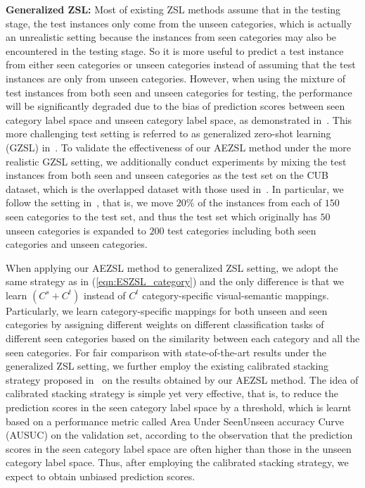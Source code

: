 \documentclass[journal]{IEEEtran}
\begin{document}
\noindent\textbf{Generalized ZSL:} 
Most of existing ZSL methods assume that in the testing stage, the test instances only come from the unseen categories, which is actually an unrealistic setting because the instances from seen categories may also be encountered in the testing stage. So it is more useful to predict a test instance from either seen categories or unseen categories instead of assuming that the test instances are only from unseen categories. However, when using the mixture of test instances from both seen and unseen categories for testing, the performance will be significantly degraded due to the bias of prediction scores between seen category label space and unseen category label space, as demonstrated in~\cite{socher2013zero,chao2016empirical}. This more challenging test setting is referred to as generalized zero-shot learning (GZSL) in~\cite{chao2016empirical}. To validate the effectiveness of our AEZSL method under the more realistic GZSL setting, we additionally conduct experiments by mixing the test instances from both seen and unseen categories as the test set on the CUB dataset, which is the overlapped dataset with those used in~\cite{chao2016empirical}. In particular, we follow the setting in~\cite{chao2016empirical}, that is, we move $20\%$ of 
the instances from each of $150$ seen categories to the test set, and thus the test set which originally has $50$ unseen categories is expanded to $200$ test categories including both seen categories and unseen categories. 

When applying our AEZSL method to generalized ZSL setting, we adopt the same strategy as in (\ref{eqn:ESZSL_category}) and the only difference is that we learn $(C^s+C^t)$ instead of $C^t$ category-specific visual-semantic mappings.
Particularly, we learn category-specific mappings for both unseen and seen categories by assigning different weights on different classification tasks of different seen categories based on the similarity between each category and all the seen categories. For fair comparison with state-of-the-art results under the generalized ZSL setting, we further employ the existing calibrated stacking strategy proposed in~\cite{chao2016empirical} on the results obtained by our AEZSL method. The idea of calibrated stacking strategy is simple yet very effective, that is, to reduce the prediction scores in the seen category label space by a threshold, which is learnt based on a performance metric called Area Under SeenUnseen
accuracy Curve (AUSUC) on the validation set, according to the observation that the prediction scores in the seen category label space are often higher than those in the unseen category label space. Thus, after employing the calibrated stacking strategy, we expect to obtain unbiased prediction scores.
\end{document}

